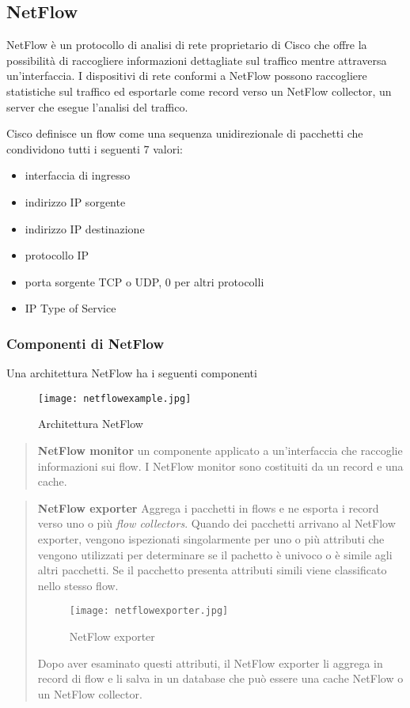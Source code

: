\documentclass[../main.tex]{subfiles}
\begin{document}
\subsection{NetFlow}
NetFlow è un protocollo di analisi di rete proprietario di Cisco che offre la possibilità di raccogliere informazioni dettagliate sul traffico mentre attraversa un'interfaccia. I dispositivi di rete conformi a NetFlow possono raccogliere statistiche sul traffico ed esportarle come record verso un NetFlow collector, un server che esegue l'analisi del traffico.

Cisco definisce un flow come una sequenza unidirezionale di pacchetti che condividono tutti i seguenti 7 valori:

\begin{itemize}
				\item interfaccia di ingresso
				\item indirizzo IP sorgente
				\item indirizzo IP destinazione
				\item protocollo IP
				\item porta sorgente TCP o UDP, 0 per altri protocolli
				\item IP Type of Service
\end{itemize}

\subsubsection{Componenti di NetFlow}
Una architettura NetFlow ha i seguenti componenti

\begin{figure}[H]
\centering
\texttt{[image: netflowexample.jpg]}
\caption{Architettura NetFlow}
\end{figure}

\begin{verse}
\textbf{NetFlow monitor}
un componente applicato a un'interfaccia che raccoglie informazioni sui flow. I NetFlow monitor sono costituiti da un record e una cache.
\end{verse}

\begin{verse}
\textbf{NetFlow exporter}
Aggrega i pacchetti in flows e ne esporta i record verso uno o più \textit{flow collectors}.
Quando dei pacchetti arrivano al NetFlow exporter, vengono ispezionati singolarmente per uno o più attributi che vengono utilizzati per determinare se il pachetto è univoco o è simile agli altri pacchetti. Se il pacchetto presenta attributi simili viene classificato nello stesso flow.


\begin{figure}[H]
\centering
\texttt{[image: netflowexporter.jpg]}
\caption{NetFlow exporter}
\end{figure}

Dopo aver esaminato questi attributi, il NetFlow exporter li aggrega in record di flow e li salva in un database che può essere una cache NetFlow o un NetFlow collector.
\end{verse}
\end{document}
